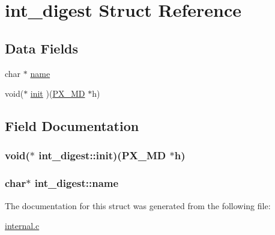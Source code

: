 \hypertarget{structint__digest}{\section{int\-\_\-digest Struct Reference}
\label{structint__digest}
}
\subsection*{Data Fields}
\begin{DoxyCompactItemize}
\item 
char $\ast$ \hyperlink{structint__digest_a174f99c47920240e2e424f34c5d7f0f7}{name}
\item 
void($\ast$ \hyperlink{structint__digest_a44eb65485145dd35a5cd127439b52e18}{init} )(\hyperlink{px_8h_a21fa22732371ffb7737caceba5e087dd}{P\-X\-\_\-\-M\-D} $\ast$h)
\end{DoxyCompactItemize}


\subsection{Field Documentation}
\hypertarget{structint__digest_a44eb65485145dd35a5cd127439b52e18}{
\subsubsection[{init}]{\setlength{\rightskip}{0pt plus 5cm}void($\ast$ int\-\_\-digest\-::init)({\bf P\-X\-\_\-\-M\-D} $\ast$h)}}\label{structint__digest_a44eb65485145dd35a5cd127439b52e18}
\hypertarget{structint__digest_a174f99c47920240e2e424f34c5d7f0f7}{
\subsubsection[{name}]{\setlength{\rightskip}{0pt plus 5cm}char$\ast$ int\-\_\-digest\-::name}}\label{structint__digest_a174f99c47920240e2e424f34c5d7f0f7}


The documentation for this struct was generated from the following file\-:\begin{DoxyCompactItemize}
\item 
\hyperlink{internal_8c}{internal.\-c}\end{DoxyCompactItemize}
